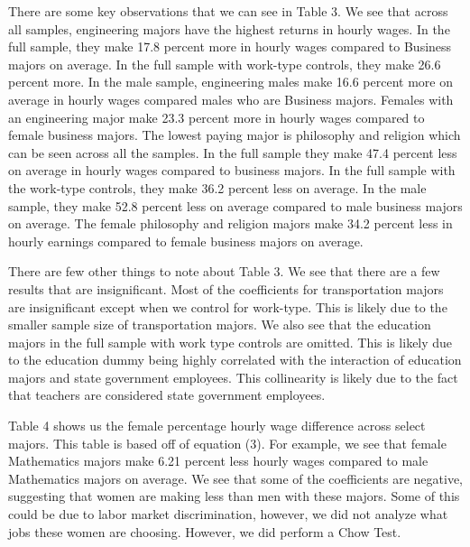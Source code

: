 \documentclass[12pt]{article}
\begin{document}
\par There are some key observations that we can see in Table 3. We see that across all samples, engineering majors have the highest returns in hourly wages. In the full sample, they make 17.8 percent more in hourly wages compared to Business majors on average. In the full sample with work-type controls, they make 26.6 percent more. In the male sample, engineering males make 16.6 percent more on average in hourly wages compared males who are Business majors. Females with an engineering major make 23.3 percent more in hourly wages compared to female business majors. The lowest paying major is philosophy and religion which can be seen across all the samples. In the full sample they make 47.4 percent less on average in hourly wages compared to business majors. In the full sample with the work-type controls, they make 36.2 percent less on average. In the male sample, they make 52.8 percent less on average compared to male business majors on average. The female philosophy and religion majors make 34.2 percent less in hourly earnings compared to female business majors on average.

\par There are few other things to note about Table 3. We see that there are a few results that are insignificant. Most of the coefficients for transportation majors are insignificant except when we control for work-type. This is likely due to the smaller sample size of transportation majors. We also see that the education majors in the full sample with work type controls are omitted. This is likely due to the education dummy being highly correlated with the interaction of education majors and state government employees. This collinearity is likely due to the fact that teachers are considered state government employees. 

\par Table 4 shows us the female percentage hourly wage difference across select majors. This table is based off of equation (3). For example, we see that female Mathematics majors make 6.21 percent less hourly wages compared to male Mathematics majors on average. We see that some of the coefficients are negative, suggesting that women are making less than men with these majors. Some of this could be due to labor market discrimination, however, we did not analyze what jobs these women are choosing. However, we did perform a Chow Test. 
\end{document}
